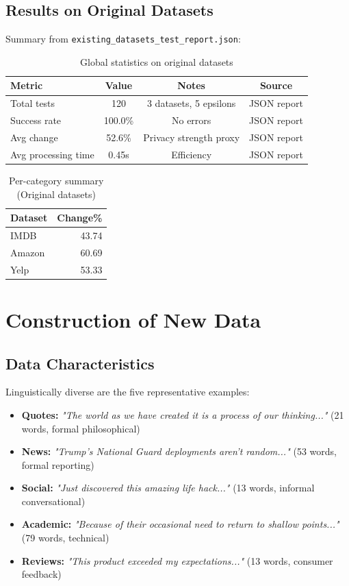 \documentclass[11pt]{article}
\begin{document}
\subsection{Results on Original Datasets}
Summary from \texttt{existing\_datasets\_test\_report.json}:
\begin{table}[H]
 \centering
 \caption{Global statistics on original datasets}
 \begin{tabular}{lccc}
 \toprule
 Metric & Value & Notes & Source \\
 \midrule
  Total tests & 120 & 3 datasets, 5 epsilons & JSON report \\
 Success rate & 100.0\% & No errors & JSON report \\
 Avg change & 52.6\% & Privacy strength proxy & JSON report \\
 Avg processing time & 0.45s & Efficiency & JSON report \\
 \bottomrule
 \end{tabular}
\end{table}

\begin{table}[H]
  \centering
  \caption{Per-category summary (Original datasets)}
  \small
  \begin{tabular}{lr}
    \toprule
    Dataset & Change\% \\
    \midrule
    IMDB & 43.74 \\
    Amazon & 60.69 \\
    Yelp & 53.33 \\
    \bottomrule
  \end{tabular}
\end{table}

\section{Construction of New Data}

\subsection{Data Characteristics}
Linguistically diverse are the five representative examples:
\begin{itemize}
    \item \textbf{Quotes:} \textit{"The world as we have created it is a process of our thinking..."} (21 words, formal philosophical)
    \item \textbf{News:} \textit{"Trump's National Guard deployments aren't random..."} (53 words, formal reporting)
    \item \textbf{Social:} \textit{"Just discovered this amazing life hack..."} (13 words, informal conversational)
    \item \textbf{Academic:} \textit{"Because of their occasional need to return to shallow points..."} (79 words, technical)
    \item \textbf{Reviews:} \textit{"This product exceeded my expectations..."} (13 words, consumer feedback)
\end{itemize}
\end{document}
